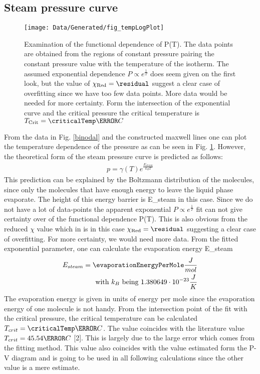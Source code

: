 \documentclass[a4paper,10pt,twocolumn]{article}
\begin{document}
    \subsection{Steam pressure curve}\label{subsec:steamPressureCurve}
    \begin{figure}
        \begin{center}
            \texttt{[image: Data/Generated/fig\_tempLogPlot]}
            \caption[]{Examination of the functional dependence of P(T). The data points are obtained from the regions of constant pressure pairing the constant pressure value with the temperature of the isotherm.
            The assumed exponential dependence $P \propto e^{\frac{1}{T}} $ does seem given on the first look, but the value of $\chi_{\text{Red}}=\residual$ suggest a clear case of overfitting since we have
            too few data points. More data would be needed for more certainty. Form the intersection of the exponential curve and the critical pressure the critical temperature is $T_{\text{Crit}}=\criticalTemp\degree C$}
            \label{fig:tempLogPLot}
        \end{center}
    \end{figure}
    From the data in Fig. \ref{binodal} and the constructed maxwell lines one can plot the temperature dependence of the pressure as can be seen in Fig. \ref{fig:tempLogPLot}.
    However, the theoretical form of the steam pressure curve is predicted as follows:
    \begin{align}
        p=\gamma(T)e^\frac{E_{steam}}{k_B T}
    \end{align}
    This prediction can be explained by the Boltzmann distribution of the molecules, since only the molecules that have enough energy to leave the liquid phase evaporate.
    The height of this energy barrier is E_{steam}\) in this case.
    Since we do not have a lot of data-points the apparent exponential $P \propto e^{\frac{1}{T}} $ fit can not give certainty over of the functional dependence P(T).
    This is also obvious from the reduced $\chi$ value which in is in this case $\chi_{\text{Red}}=\residual$ suggesting a clear case of overfitting.
    For more certainty, we would need more data.
    From the fitted exponential parameter, one can calculate the evaporation energy E_{steam}\)
    \begin{align}
        E_{steam} = \evaporationEnergyPerMole \frac{J}{mol}
        \endline \text{with } k_B \text{ being } 1.380649\cdot 10^{-23}\frac{J}{K}
    \end{align}
    The evaporation energy is given in units of energy per mole since the evaporation energy of one molecule is not handy. 
    From the intersection point of the fit with the critical pressure, the critical temperature can be calculated $T_{crit}=\criticalTemp\degree C $.
    The value coincides with the literature value $T_{crit} = 45.54\degree C$ [2].
    This is largely due to the large error which comes from the fitting method.
    This value also coincides with the value estimated form the P-V diagram and is going to be used in all following calculations since the other value is a mere estimate.
    
\end{document}
